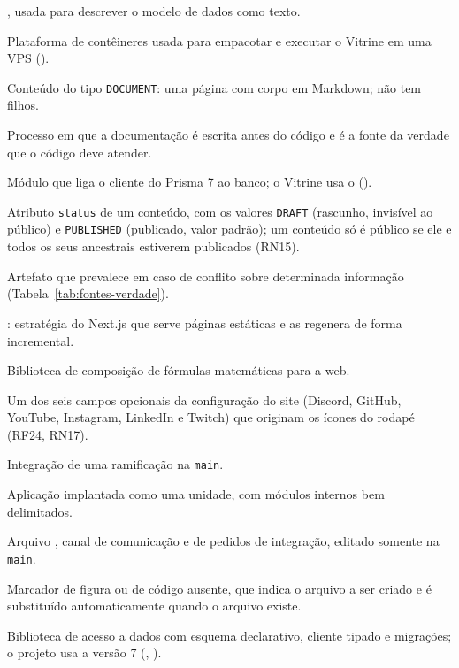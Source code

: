 \begin{description}[style=nextline, leftmargin=0.6cm, itemsep=4pt]
  \item[DBML] , usada para descrever o modelo de dados como texto.
  \item[Docker] Plataforma de contêineres usada para empacotar e executar o Vitrine em uma VPS ().
  \item[Documento] Conteúdo do tipo \texttt{DOCUMENT}: uma página com corpo em Markdown; não tem filhos.
  \item[Documentation-Driven Development] Processo em que a documentação é escrita antes do código e é a fonte da verdade que o código deve atender.
  \item[\en{Driver adapter}] Módulo que liga o cliente do Prisma 7 ao banco; o Vitrine usa o  ().
  \item[Estado de publicação] Atributo \texttt{status} de um conteúdo, com os valores \texttt{DRAFT} (rascunho, invisível ao público) e \texttt{PUBLISHED} (publicado, valor padrão); um conteúdo só é público se ele e todos os seus ancestrais estiverem publicados (RN15).
  \item[Fonte da verdade] Artefato que prevalece em caso de conflito sobre determinada informação (Tabela~\ref{tab:fontes-verdade}).
  \item[ISR] : estratégia do Next.js que serve páginas estáticas e as regenera de forma incremental.
  \item[KaTeX] Biblioteca de composição de fórmulas matemáticas para a web.
  \item[Link social] Um dos seis campos opcionais da configuração do site (Discord, GitHub, YouTube, Instagram, LinkedIn e Twitch) que originam os ícones do rodapé (RF24, RN17).
  \item[Merge] Integração de uma ramificação na \texttt{main}.
  \item[Monólito modular] Aplicação implantada como uma unidade, com módulos internos bem delimitados.
  \item[Mural] Arquivo , canal de comunicação e de pedidos de integração, editado somente na \texttt{main}.
  \item[Placeholder] Marcador de figura ou de código ausente, que indica o arquivo a ser criado e é substituído automaticamente quando o arquivo existe.
  \item[Prisma] Biblioteca de acesso a dados com esquema declarativo, cliente tipado e migrações; o projeto usa a versão 7 (, ).

\end{description}
